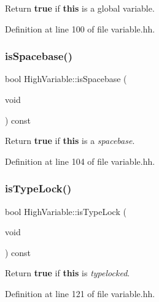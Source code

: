 Return {\bfseries{true}} if {\bfseries{this}} is a global variable. 



Definition at line 100 of file variable.\+hh.

\mbox{\label{class_high_variable_a5a0d90d626d382e4e8b96e34b6e46cf1}} 
\subsubsection{\texorpdfstring{isSpacebase()}{isSpacebase()}}
{\footnotesize\ttfamily bool High\+Variable\+::is\+Spacebase (\begin{DoxyParamCaption}\item[{void}]{ }\end{DoxyParamCaption}) const\hspace{0.3cm}{\ttfamily [inline]}}



Return {\bfseries{true}} if {\bfseries{this}} is a {\itshape spacebase}. 



Definition at line 104 of file variable.\+hh.

\mbox{\label{class_high_variable_a745952b13c07ec2abacf39fa2da8b3c6}} 
\subsubsection{\texorpdfstring{isTypeLock()}{isTypeLock()}}
{\footnotesize\ttfamily bool High\+Variable\+::is\+Type\+Lock (\begin{DoxyParamCaption}\item[{void}]{ }\end{DoxyParamCaption}) const\hspace{0.3cm}{\ttfamily [inline]}}



Return {\bfseries{true}} if {\bfseries{this}} is {\itshape typelocked}. 



Definition at line 121 of file variable.\+hh.

\mbox{\label{class_high_variable_a9344764c89aa949fc3fe0b8512d5f549}} 
